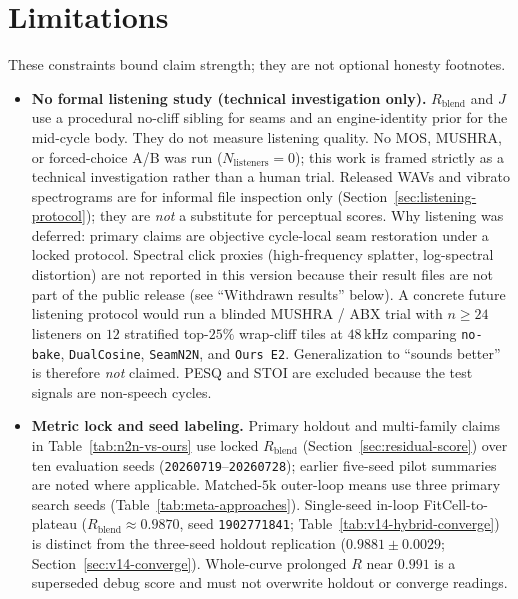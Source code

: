 \section{Limitations}
\label{sec:limitations}

These constraints bound claim strength; they are not optional honesty footnotes.

\begin{itemize}
  \item \textbf{No formal listening study (technical investigation only).}
    $R_{\mathrm{blend}}$ and $J$ use a procedural no-cliff sibling for seams and an engine-identity prior for the mid-cycle body.
    They do not measure listening quality.
    No MOS, MUSHRA, or forced-choice A/B was run ($N_{\mathrm{listeners}}{=}0$); this work is framed strictly as a technical investigation rather than a human trial.
    Released WAVs and vibrato spectrograms are for informal file inspection only
    (Section~\ref{sec:listening-protocol}); they are \emph{not} a substitute for perceptual scores.
    Why listening was deferred: primary claims are objective cycle-local seam restoration under a locked protocol. Spectral click proxies (high-frequency splatter, log-spectral distortion) are not reported in this version because their result files are not part of the public release (see ``Withdrawn results'' below). A concrete future listening protocol would run a blinded MUSHRA / ABX trial with $n{\ge}24$ listeners on $12$ stratified top-$25\%$ wrap-cliff tiles at $48$\,kHz comparing \texttt{no-bake}, \texttt{DualCosine}, \texttt{SeamN2N}, and \texttt{Ours E2}.
    Generalization to ``sounds better'' is therefore \emph{not} claimed.
    PESQ and STOI are excluded because the test signals are non-speech cycles.
  \item \textbf{Metric lock and seed labeling.}
    Primary holdout and multi-family claims in Table~\ref{tab:n2n-vs-ours} use locked $R_{\mathrm{blend}}$ (Section~\ref{sec:residual-score}) over ten evaluation seeds (\texttt{20260719}--\texttt{20260728}); earlier five-seed pilot summaries are noted where applicable.
    Matched-$5$k outer-loop means use three primary search seeds (Table~\ref{tab:meta-approaches}).
    Single-seed in-loop FitCell-to-plateau ($R_{\mathrm{blend}}{\approx}0.9870$, seed \texttt{1902771841}; Table~\ref{tab:v14-hybrid-converge}) is distinct from the three-seed holdout replication ($0.9881{\pm}0.0029$; Section~\ref{sec:v14-converge}).
    Whole-curve prolonged $R$ near $0.991$ is a superseded debug score and must not overwrite holdout or converge readings.

\end{itemize}
